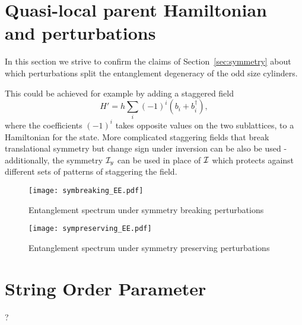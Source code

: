 
\section{Quasi-local parent Hamiltonian and perturbations}
\label{sec:perturbations}

In this section we strive to confirm the claims of Section~\ref{sec:symmetry} about
which perturbations split the entanglement degeneracy of the odd size cylinders.

This could be achieved for example by adding a staggered field 
$$
H' = h \sum\limits_{i} (-1)^i \left(b_i + b_i^{\dagger}\right),
$$
where the coefficients $(-1)^i$ takes opposite values on the two sublattices, 
to a Hamiltonian for the state. More complicated staggering fields that break translational 
symmetry but change sign under inversion can be also be used - additionally, the symmetry $\mathcal{I}_y$ 
can be used in place of $\mathcal{I}$ which protects against different sets of patterns of staggering the 
field.

\begin{figure}[htbp]
	\centering
		\texttt{[image: symbreaking\_EE.pdf]}
	\caption{Entanglement spectrum under symmetry breaking perturbations}
	\label{fig:symbreaking_EE}
\end{figure}

\begin{figure}[htbp]
	\centering
		\texttt{[image: sympreserving\_EE.pdf]}
	\caption{Entanglement spectrum under symmetry preserving perturbations}
	\label{fig:symbreaking_EE}
\end{figure}


\section{String Order Parameter}
\label{sec:stringorder}
?


